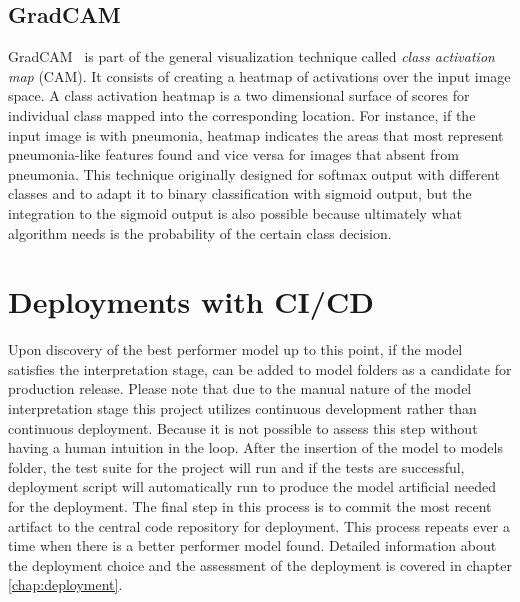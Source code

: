 \subsection{GradCAM}
GradCAM~\cite{heatmap} is part of the general visualization technique called \emph{class activation map} (CAM).
It consists of creating a heatmap of activations over the input image space.
A class activation heatmap is a two dimensional surface of scores for individual class mapped into the corresponding location. For instance, if the input image is with pneumonia, heatmap indicates the areas that most represent pneumonia-like features found and vice versa for images that absent from pneumonia.
This technique originally designed for softmax output with different classes and to adapt it to binary classification with sigmoid output, but the integration to the sigmoid output is also possible because ultimately what algorithm needs is the probability of the certain class decision.

\section{Deployments with CI/CD}
Upon discovery of the best performer model up to this point, if the model satisfies the interpretation stage, can be added to model folders as a candidate for production release.
Please note that due to the manual nature of the model interpretation stage this project utilizes continuous development rather than continuous deployment.
Because it is not possible to assess this step without having a human intuition in the loop.
After the insertion of the model to models folder, the test suite for the project will run and if the tests are successful, deployment script will automatically run to produce the model artificial needed for the deployment.
The final step in this process is to commit the most recent artifact to the central code repository for deployment.
This process repeats ever a time when there is a better performer model found.
Detailed information about the deployment choice and the assessment of the deployment is covered in chapter \ref{chap:deployment}.

